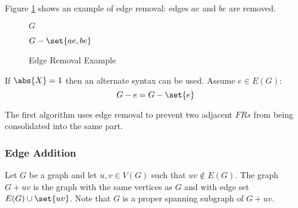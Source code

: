 Figure \ref{fig:eremove} shows an example of edge removal: edges \(ae\) and \(be\) are removed.

\begin{figure}[h]
  \label{fig:eremove}
  \begin{minipage}{3in}
    \begin{center}

      \bigskip

      \(G\)
    \end{center}
  \end{minipage}
  \begin{minipage}{3in}
    \begin{center}

      \bigskip

      \(G-\set{ae,be}\)
    \end{center}
  \end{minipage}
  \caption{Edge Removal Example}
\end{figure}

If \(\abs{X}=1\) then an alternate syntax can be used.  Assume \(e\in E(G)\):
\[G-e=G-\set{e}\]

The first algorithm uses edge removal to prevent two adjacent \(FRs\) from being consolidated into the same part.

\subsubsection{Edge Addition}

Let \(G\) be a graph and let \(u,v\in V(G)\) such that \(uv\notin E(G)\).  The graph \(G+uv\) is the graph with the
same vertices as \(G\) and with edge set \(E(G)\cup\set{uv}\).  Note that \(G\) is a proper spanning subgraph of
\(G+uv\).

